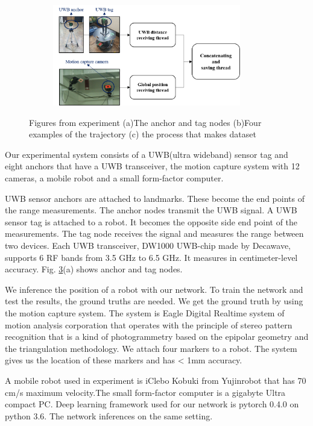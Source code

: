 \documentclass{ieeeaccess}
\begin{document}
\begin{figure}[h]
\begin{subfigure}[b]{.25\textwidth}
		\label{fig:nodes} 	
		\caption{}
	\end{subfigure}%
	\begin{subfigure}[b]{.5\textwidth}
		\centering
		\includegraphics[width=0.9\textwidth]{dataset_process}
		\label{fig:trajectories} 	
		\caption{}
	\end{subfigure}
	\caption{Figures from experiment (a)The anchor and tag nodes (b)Four examples of the trajectory (c) the process that makes dataset}
	\label{fig:experiment}
\end{figure}
Our experimental system consists of a UWB(ultra wideband) sensor tag and eight anchors that have a UWB transceiver, the motion capture system with 12 cameras, a mobile robot and a small form-factor computer.

UWB sensor anchors are attached to landmarks. These become the end points of the range measurements. The anchor nodes transmit the UWB signal. A UWB sensor tag is attached to a robot. It becomes the opposite side end point of the measurements. The tag node receives the signal and measures the range between two devices. Each UWB transceiver, DW1000 UWB-chip made by Decawave, supports 6 RF bands from 3.5 GHz to 6.5 GHz. It measures in centimeter-level accuracy. Fig. \ref{fig:experiment}(a) shows anchor and tag nodes.

We inference the position of a robot with our network. To train the network and test the results, the ground truths are needed. We get the ground truth by using the motion capture system. The system is Eagle Digital Realtime system of motion analysis corporation that operates with the principle of stereo pattern recognition that is a kind of photogrammetry based on the epipolar geometry and the triangulation methodology. We attach four markers to a robot. The system gives us the location of these markers and has < 1mm accuracy.

A mobile robot used in experiment is iClebo Kobuki from Yujinrobot that has 70 cm/s maximum velocity.The small form-factor computer is a gigabyte Ultra compact PC. Deep learning framework used for our network is pytorch 0.4.0 on python 3.6. The network inferences on the same setting.
\end{document}
